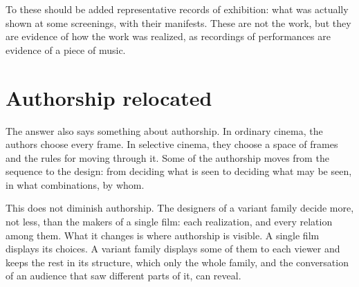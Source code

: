 To these should be added representative records of exhibition: what was actually shown at some screenings, with their manifests. These are not the work, but they are evidence of how the work was realized, as recordings of performances are evidence of a piece of music.

\section{Authorship relocated}

The answer also says something about authorship. In ordinary cinema, the authors choose every frame. In selective cinema, they choose a space of frames and the rules for moving through it. Some of the authorship moves from the sequence to the design: from deciding what is seen to deciding what may be seen, in what combinations, by whom.

This does not diminish authorship. The designers of a variant family decide more, not less, than the makers of a single film: each realization, and every relation among them. What it changes is where authorship is visible. A single film displays its choices. A variant family displays some of them to each viewer and keeps the rest in its structure, which only the whole family, and the conversation of an audience that saw different parts of it, can reveal.
